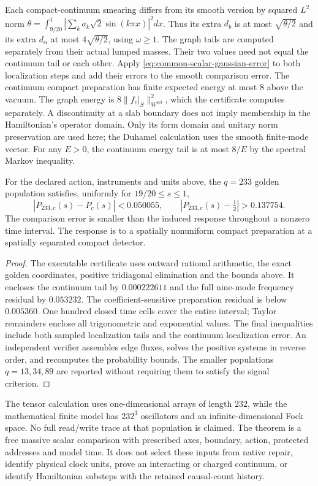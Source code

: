 Each compact-continuum smearing differs from its smooth version by squared
$L^2$ norm
$\theta=\int_{9/20}^1|\sum_k a_k\sqrt2\sin(k\pi x)|^2dx$.
Thus its extra $d_b$ is at most $\sqrt{\theta/2}$ and its extra
$d_\alpha$ at most $4\sqrt{\theta/2}$, using $\omega\ge1$.
The graph tails are computed separately from their actual lumped masses.
Their two values need not equal the continuum tail or each other.
Apply \eqref{eq:common-scalar-gaussian-error} to both localization steps
and add their errors to the smooth comparison error.
The continuum compact preparation has finite expected energy at most $8$
above the vacuum. The graph energy is $8\|f_c|_S\|_{W^{\otimes3}}^2$,
which the certificate computes separately.
A discontinuity at a slab boundary does not imply membership
in the Hamiltonian's operator domain. Only its form domain and unitary
norm preservation are used here; the Duhamel calculation uses the smooth
finite-mode vector. For any $E>0$, the continuum energy tail is at most $8/E$ by
the spectral Markov inequality.

\begin{theorem}
\label{thm:source-common-scalar-response}
For the declared action, instruments and units above, the $q=233$ golden
population satisfies, uniformly for $19/20\le s\le1$,
\[
 |P_{233,c}(s)-P_c(s)|<0.050055,
 \qquad |P_{233,c}(s)-\tfrac12|>0.137754.
\]
The comparison error is smaller than the induced response throughout a
nonzero time interval. The response is to a spatially nonuniform compact
preparation at a spatially separated compact detector.
\end{theorem}
\begin{proof}
The executable certificate uses outward rational arithmetic, the exact
golden coordinates, positive tridiagonal elimination and the bounds above.
It encloses the continuum tail by $0.000222611$ and the full nine-mode
frequency residual by $0.053232$. The coefficient-sensitive preparation
residual is below $0.005360$. One hundred closed time cells cover the
entire interval; Taylor remainders enclose all trigonometric and exponential
values. The final inequalities include both sampled localization tails
and the continuum localization error. An independent verifier assembles
edge fluxes, solves the positive systems in reverse order, and recomputes
the probability bounds. The smaller populations $q=13,34,89$ are reported
without requiring them to satisfy the signal criterion.
\end{proof}

The tensor calculation uses one-dimensional arrays of length $232$, while
the mathematical finite model has $232^3$ oscillators and an
infinite-dimensional Fock space. No full read/write trace at that population
is claimed. The theorem is a free massive scalar comparison with prescribed
axes, boundary, action, protected addresses and model time. It does not
select these inputs from native repair, identify physical clock units,
prove an interacting or charged continuum, or identify Hamiltonian
substeps with the retained causal-count history.
